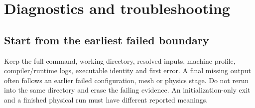 \chapter{Diagnostics and troubleshooting}\label{ch:troubleshooting}
\section{Start from the earliest failed boundary}
Keep the full command, working directory, resolved inputs, machine profile,
compiler/runtime logs, executable identity and first error. A final missing
output often follows an earlier failed configuration, mesh or physics stage.
Do not rerun into the same directory and erase the failing evidence.
An initialization-only exit and a finished physical run must have different
reported meanings.

